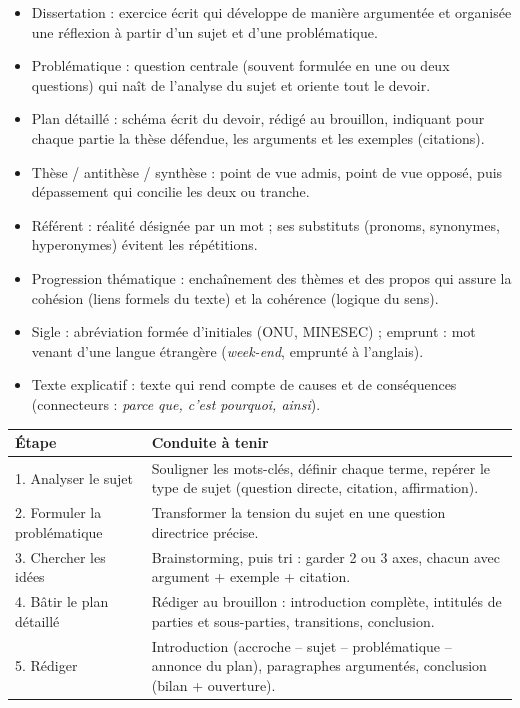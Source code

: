 \documentclass[11pt]{article}
\newcommand{\cle}[1]{{\popxbold\color{popdark}#1}}
\begin{document}
\begin{definition}
\begin{itemize}
\item \cle{Dissertation} : exercice écrit qui développe de manière argumentée et organisée une réflexion à partir d'un sujet et d'une problématique.
\item \cle{Problématique} : question centrale (souvent formulée en une ou deux questions) qui naît de l'analyse du sujet et oriente tout le devoir.
\item \cle{Plan détaillé} : schéma écrit du devoir, rédigé au brouillon, indiquant pour chaque partie la thèse défendue, les arguments et les exemples (citations).
\item \cle{Thèse / antithèse / synthèse} : point de vue admis, point de vue opposé, puis dépassement qui concilie les deux ou tranche.
\item \cle{Référent} : réalité désignée par un mot ; ses \cle{substituts} (pronoms, synonymes, hyperonymes) évitent les répétitions.
\item \cle{Progression thématique} : enchaînement des thèmes et des propos qui assure la \cle{cohésion} (liens formels du texte) et la \cle{cohérence} (logique du sens).
\item \cle{Sigle} : abréviation formée d'initiales (ONU, MINESEC) ; \cle{emprunt} : mot venant d'une langue étrangère (\emph{week-end}, emprunté à l'anglais).
\item \cle{Texte explicatif} : texte qui rend compte de causes et de conséquences (connecteurs : \emph{parce que, c'est pourquoi, ainsi}).
\end{itemize}
\end{definition}

\begin{methode}
\begin{center}
\begin{tabularx}{\linewidth}{|l|X|}
\hline
\rowcolor{popblueL} \textbf{Étape} & \textbf{Conduite à tenir} \\
\hline
1. Analyser le sujet & Souligner les mots-clés, définir chaque terme, repérer le type de sujet (question directe, citation, affirmation). \\
\hline
2. Formuler la problématique & Transformer la tension du sujet en une question directrice précise. \\
\hline
3. Chercher les idées & Brainstorming, puis tri : garder 2 ou 3 axes, chacun avec argument + exemple + citation. \\
\hline
4. Bâtir le plan détaillé & Rédiger au brouillon : introduction complète, intitulés de parties et sous-parties, transitions, conclusion. \\
\hline
5. Rédiger & Introduction (accroche -- sujet -- problématique -- annonce du plan), paragraphes argumentés, conclusion (bilan + ouverture). \\
\hline
\end{tabularx}
\end{center}
\end{methode}
\end{document}
